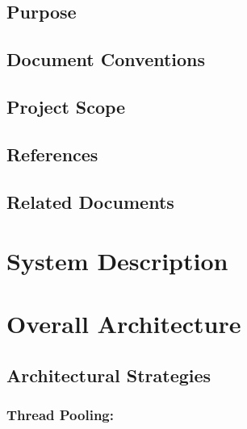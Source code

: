 \documentclass[12pt]{article}
\begin{document}
	\subsection{Purpose}


	\subsection{Document Conventions}


	\subsection{Project Scope}


	\subsection{References}


	\subsection{Related Documents}



\section{System Description}




\section{Overall Architecture}



	\subsection{Architectural Strategies}
	
	

	\subsubsection {Thread Pooling:} 
\end{document}
